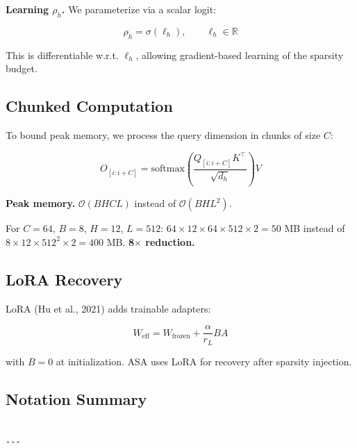\textbf{Learning $\rho_h$.} We parameterize via a scalar logit:

\begin{equation}
\rho_h = \sigma(\ell_h), \qquad \ell_h \in \mathbb{R}
\end{equation}

This is differentiable w.r.t. $\ell_h$, allowing gradient-based learning of 
the sparsity budget.

\subsection{Chunked Computation}

To bound peak memory, we process the query dimension in chunks of size $C$:

\begin{equation}
O_{[i:i+C]} = \text{softmax}\!\left(\frac{Q_{[i:i+C]} K^\top}{\sqrt{d_h}}\right) V
\end{equation}

\textbf{Peak memory.} $\mathcal{O}(B H C L)$ instead of $\mathcal{O}(B H L^2)$.

For $C = 64$, $B = 8$, $H = 12$, $L = 512$: $64 \times 12 \times 64 \times 512 \times 2 = 50$ MB 
instead of $8 \times 12 \times 512^2 \times 2 = 400$ MB. \textbf{8$\times$ reduction.}

\subsection{LoRA Recovery}

LoRA (Hu et al., 2021) adds trainable adapters:

\begin{equation}
W_\text{eff} = W_\text{frozen} + \frac{\alpha}{r_L} B A
\end{equation}

with $B = 0$ at initialization. ASA uses LoRA for recovery after sparsity 
injection.

\subsection{Notation Summary}

\begin{lstlisting}

---
\end{lstlisting}